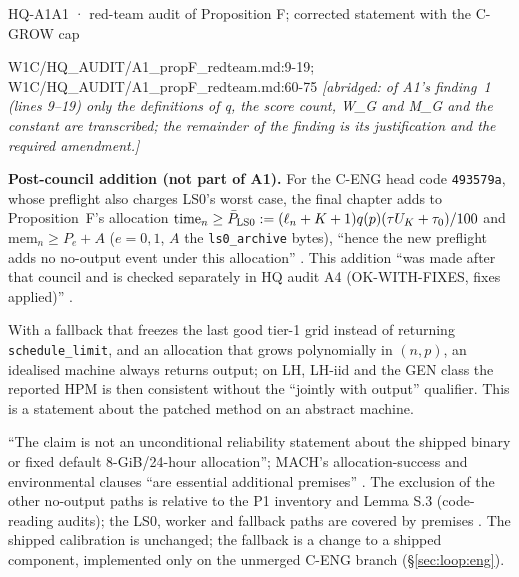 \begin{card}{HQ-A1}{A1 · red-team audit of Proposition F; corrected statement with the C-GROW cap}
\begin{stmt}{W1C/HQ_AUDIT/A1_propF_redteam.md:9-19; W1C/HQ_AUDIT/A1_propF_redteam.md:60-75}
\textit{[abridged: of A1's finding~1 (lines 9--19) only the definitions of q, the score count, W\_G and M\_G and the constant are transcribed; the remainder of the finding is its justification and the required amendment.]}
\end{stmt}
\textbf{Post-council addition (not part of A1).} For the C-ENG head code \texttt{493579a}, whose preflight also charges LS0's worst case, the final chapter adds to Proposition~F's allocation $\mathrm{time}_n\ge\bar P_{\rm LS0}:=(\ell_n+K+1)q(p)(\tau U_K+\tau_0)/100$ and $\mathrm{mem}_n\ge P_e+A$ ($e=0,1$, $A$ the \texttt{ls0\_archive} bytes), ``hence the new preflight adds no no-output event under this allocation'' . This addition ``was made after that council and is checked separately in HQ audit A4 (OK-WITH-FIXES, fixes applied)'' .
\begin{plain}With a fallback that freezes the last good tier-1 grid instead of returning \texttt{schedule\_limit}, and an allocation that grows polynomially in $(n,p)$, an idealised machine always returns output; on LH, LH-iid and the GEN class the reported HPM is then consistent without the ``jointly with output'' qualifier. This is a statement about the patched method on an abstract machine.\end{plain}
\begin{notproved}
``The claim is not an unconditional reliability statement about the shipped binary or fixed default 8-GiB/24-hour allocation''; MACH's allocation-success and environmental clauses ``are essential additional premises'' . The exclusion of the other no-output paths is relative to the P1 inventory and Lemma S.3 (code-reading audits); the LS0, worker and fallback paths are covered by premises . The shipped calibration is unchanged; the fallback is a change to a shipped component, implemented only on the unmerged C-ENG branch (\S\ref{sec:loop:eng}).
\end{notproved}
\end{card}

